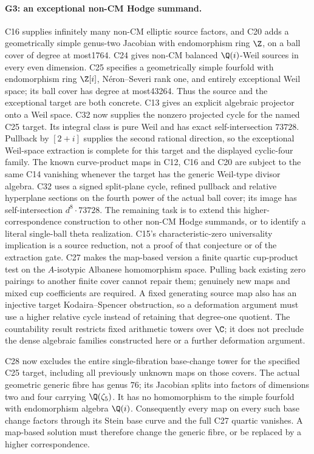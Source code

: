 \paragraph{G3: an exceptional non-CM Hodge summand.}
C16 supplies infinitely many non-CM elliptic source factors, and
C20 adds a geometrically simple genus-two Jacobian with
endomorphism ring $\Z$, on a ball cover of degree at most1764.
C24 gives non-CM balanced $\Q(i)$-Weil sources in every
even dimension. C25 specifies a geometrically simple fourfold
with endomorphism ring $\Z[i]$, N\'eron--Severi rank one,
and entirely exceptional Weil space; its ball cover has degree
at most43264. Thus the source and the exceptional target
are both concrete.
C13 gives an explicit algebraic projector onto a Weil space.
C32 now supplies the nonzero projected cycle for the named
C25 target. Its integral class is pure Weil and has exact
self-intersection $73728$. Pullback by $[2+i]$ supplies the
second rational direction, so the exceptional Weil-space
extraction is complete for this target and the displayed
cyclic-four family.
The known curve-product maps in C12, C16 and C20 are subject to the
same C14 vanishing whenever the target has the generic Weil-type
divisor algebra. C32 uses a signed split-plane cycle, refined
pullback and relative hyperplane sections on the fourth power
of the actual ball cover; its image has self-intersection
$d^8\cdot73728$. The remaining task is to extend this
higher-correspondence construction to other non-CM Hodge
summands, or to identify a literal single-ball theta realization.
C15's characteristic-zero universality implication is a source
reduction, not a proof of that conjecture or of the extraction gate.
C27 makes the map-based version a finite quartic cup-product
test on the $A$-isotypic Albanese homomorphism space. Pulling
back existing zero pairings to another finite cover cannot
repair them; genuinely new maps and mixed cup coefficients
are required. A fixed generating source map also has an
injective target Kodaira--Spencer obstruction, so a deformation
argument must use a higher relative cycle instead of retaining
that degree-one quotient.
The countability result restricts fixed arithmetic towers over
$\C$; it does not preclude the dense algebraic families constructed
here or a further deformation argument.

C28 now excludes the entire single-fibration base-change
tower for the specified C25 target, including all previously
unknown maps on those covers. The actual geometric generic
fibre has genus $76$; its Jacobian splits into factors of
dimensions two and four carrying $\Q(\zeta_5)$. It has no
homomorphism to the simple fourfold with endomorphism algebra
$\Q(i)$. Consequently every map on every such base change
factors through its Stein base curve and the full C27 quartic
vanishes. A map-based solution must therefore change the
generic fibre, or be replaced by a higher correspondence.

